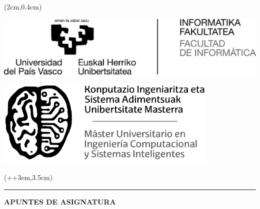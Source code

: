 
\begin{titlepage}
    \begin{textblock*}{\textwidth}(2cm,0.4cm)
        \begin{center}
            \begin{minipage}{0.45\textwidth}
                \centering
                \includegraphics[width=\textwidth]{common/Logo_EHU.jpg}
            \end{minipage}\hfill
            \begin{minipage}{0.45\textwidth}
                \centering
                \includegraphics[width=0.8\textwidth]{common/Logo_KISA.png} 
            \end{minipage}
        \end{center}
    \end{textblock*}
    
    
    \begin{textblock*}{\paperwidth}(\dimexpr\parindent+\oddsidemargin+3em\relax,3.5cm)
        \begin{minipage}{\dimexpr\linewidth-7.5cm\relax}
            \color{white}
            \noindent\rule{\linewidth}{0cm}
            \textsf{ {\large \titulo}}
            \newline
            \newline \newline
            \textsf{\textbf{ {\Huge APUNTES DE ASIGNATURA }}}
        \end{minipage}
    \end{textblock*}
    

\end{titlepage}

